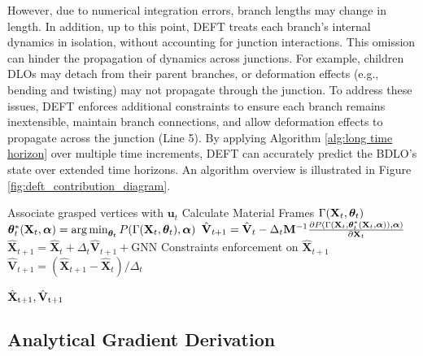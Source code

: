 However, due to numerical integration errors, branch lengths may change in length.
In addition, up to this point, DEFT treats each branch’s internal dynamics in isolation, without accounting for junction interactions. 
This omission can hinder the propagation of dynamics across junctions.
For example, children DLOs may detach from their parent branches, or deformation effects (e.g., bending and twisting) may not propagate through the junction.
To address these issues, DEFT enforces additional constraints to ensure each branch remains inextensible, maintain branch connections, and allow deformation effects to propagate across the junction (Line 5).
By applying Algorithm \ref{alg:long time horizon} over multiple time increments, DEFT can accurately predict the BDLO’s state over extended time horizons.
An algorithm overview is illustrated in Figure \ref{fig:deft_contribution_diagram}.

\begin{algorithm}[t]
\caption{$(\pred{X}{t+1}, \pred{V}{t+1}) = \textbf{DEFT}(\pred{X}{t}, \pred{V}{t}, \textbf{u}_t$)} 
\label{alg:long time horizon}
\begin{algorithmic}[1]
\State Associate grasped vertices with $\textbf{u}_t$
\State Calculate Material Frames $\Gamma(\textbf{X}_t, \bm{\theta}_t)$ \Comment{\eqref{eq:m1},\eqref{eq:m2}}
\State $\bm{\theta}^*_t(\textbf{X}_t,\bm{\alpha}) = \operatorname*{arg\,min}_{\bm{\theta}_t} P(\Gamma(\textbf{X}_t, \bm{\theta}_t),\bm{\alpha})$ 
\State $\hat{\textbf{V}}_{t+1} = \hat{\textbf{V}}_t-\Delta_t \mathbf{M}^{-1}\frac{\partial P(\Gamma(\textbf{X}_t, \bm{\theta}^*_t(\textbf{X}_t,\bm{\alpha})),\bm{\alpha})}{\partial \textbf{X}_{t}}$ \Comment{\eqref{eq:Semi-Euler1}}   
\State $\hat{\mathbf{X}}_{t+1} = \hat{\mathbf{X}}_t + \Delta_t\hat{\textbf{V}}_{t+1} + \text{GNN}$  \label{alg1:residual}
\State Constraints enforcement on $\hat{\mathbf{X}}_{t+1}$ 
\State $\hat{\textbf{V}}_{t+1} = (\hat{\mathbf{X}}_{t+1} - \hat{\mathbf{X}}_t)/\Delta_t$ 
\end{algorithmic}
\Return $\hat{\mathbf{X}}_\text{t+1}, \hat{\mathbf{V}}_\text{t+1}$
\end{algorithm}

\subsection{Analytical Gradient Derivation}
\label{section:gradientopt}

